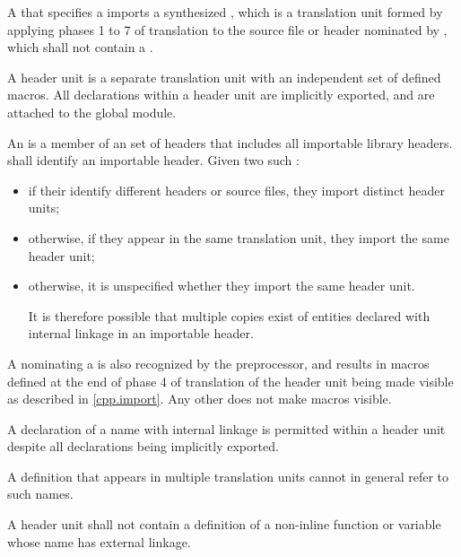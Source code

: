 \pnum
A  that specifies
a   imports
a synthesized ,
which is a translation unit formed by applying
phases 1 to 7 of translation
to the source file or header nominated by ,
which shall not contain a .
\begin{note}
A header unit is a separate translation unit with
an independent set of defined macros.
All declarations within a header unit are implicitly
exported,
and are attached to the global module.
\end{note}
An  is a member of an
set of headers that
includes all importable \Cpp{} library headers.
 shall identify an importable header.
Given two such :
\begin{itemize}
\item
if their  identify
different headers or source files,
they import distinct header units;
\item
otherwise, if they appear in the same translation unit,
they import the same header unit;
\item
otherwise, it is unspecified whether they import the same header unit.
\begin{note}
It is therefore possible that multiple copies exist of entities
declared with internal linkage in an importable header.
\end{note}
\end{itemize}
\begin{note}
A  nominating
a  is also recognized by the
preprocessor, and results in macros defined at the
end of phase 4 of translation of the header unit
being made visible as described in \ref{cpp.import}.
Any other 
does not make macros visible.
\end{note}

\pnum
A declaration of a name with internal linkage is
permitted within a header unit despite all
declarations being implicitly exported.
\begin{note}
A definition that appears in multiple translation units
cannot in general refer to such names.
\end{note}
A header unit shall not contain
a definition of a non-inline function or variable
whose name has external linkage.

